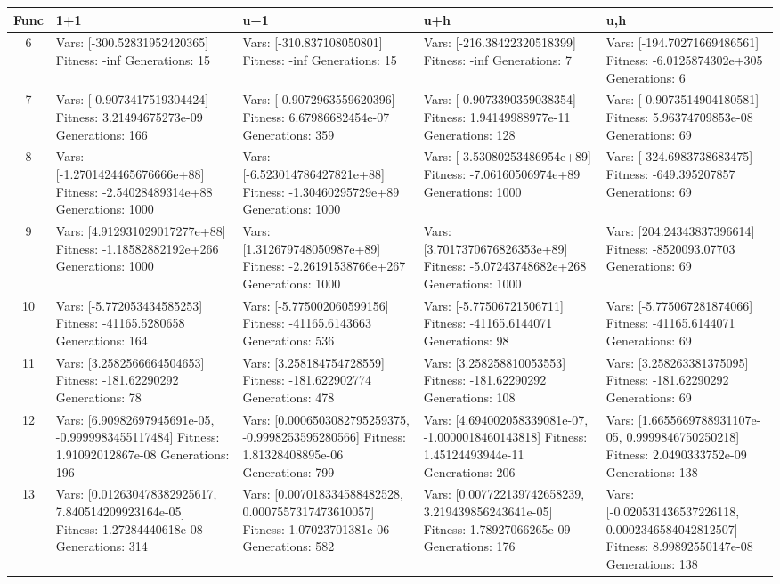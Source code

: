 \documentclass[landscape,11pt]{article}
\begin{document}
\begin{tabular}{|c|p{5.4cm}|p{5.4cm}|p{5.4cm}|p{5.4cm}|}
\hline
Func & 1+1 & u+1 & u+h & u,h \\ 
\hline 6 & Vars: [-300.52831952420365] Fitness: -inf Generations: 15 & Vars: [-310.837108050801] Fitness: -inf Generations: 15 & Vars: [-216.38422320518399] Fitness: -inf Generations: 7 & Vars: [-194.70271669486561] Fitness: -6.0125874302e+305 Generations: 6 \\
 \hline 
 7 & Vars: [-0.9073417519304424] Fitness: 3.21494675273e-09 Generations: 166 & Vars: [-0.9072963559620396] Fitness: 6.67986682454e-07 Generations: 359 & Vars: [-0.9073390359038354] Fitness: 1.94149988977e-11 Generations: 128 & Vars: [-0.9073514904180581] Fitness: 5.96374709853e-08 Generations: 69 \\
 \hline 
 8 & Vars: [-1.2701424465676666e+88] Fitness: -2.54028489314e+88 Generations: 1000 & Vars: [-6.523014786427821e+88] Fitness: -1.30460295729e+89 Generations: 1000 & Vars: [-3.53080253486954e+89] Fitness: -7.06160506974e+89 Generations: 1000 & Vars: [-324.6983738683475] Fitness: -649.395207857 Generations: 69 \\
 \hline 
 9 & Vars: [4.912931029017277e+88] Fitness: -1.18582882192e+266 Generations: 1000 & Vars: [1.312679748050987e+89] Fitness: -2.26191538766e+267 Generations: 1000 & Vars: [3.7017370676826353e+89] Fitness: -5.07243748682e+268 Generations: 1000 & Vars: [204.24343837396614] Fitness: -8520093.07703 Generations: 69 \\
 \hline 
 10 & Vars: [-5.772053434585253] Fitness: -41165.5280658 Generations: 164 & Vars: [-5.775002060599156] Fitness: -41165.6143663 Generations: 536 & Vars: [-5.77506721506711] Fitness: -41165.6144071 Generations: 98 & Vars: [-5.775067281874066] Fitness: -41165.6144071 Generations: 69 \\
 \hline 
 11 & Vars: [3.2582566664504653] Fitness: -181.62290292 Generations: 78 & Vars: [3.258184754728559] Fitness: -181.622902774 Generations: 478 & Vars: [3.258258810053553] Fitness: -181.62290292 Generations: 108 & Vars: [3.258263381375095] Fitness: -181.62290292 Generations: 69 \\
 \hline 
 12 & Vars: [6.90982697945691e-05, -0.9999983455117484] Fitness: 1.91092012867e-08 Generations: 196 & Vars: [0.0006503082795259375, -0.9998253595280566] Fitness: 1.81328408895e-06 Generations: 799 & Vars: [4.694002058339081e-07, -1.0000018460143818] Fitness: 1.45124493944e-11 Generations: 206 & Vars: [1.6655669788931107e-05, 0.9999846750250218] Fitness: 2.0490333752e-09 Generations: 138 \\
 \hline 
 13 & Vars: [0.012630478382925617, 7.840514209923164e-05] Fitness: 1.27284440618e-08 Generations: 314 & Vars: [0.007018334588482528, 0.0007557317473610057] Fitness: 1.07023701381e-06 Generations: 582 & Vars: [0.007722139742658239, 3.219439856243641e-05] Fitness: 1.78927066265e-09 Generations: 176 & Vars: [-0.020531436537226118, 0.0002346584042812507] Fitness: 8.99892550147e-08 Generations: 138 \\
 \hline 
\end{tabular}
\end{document}
